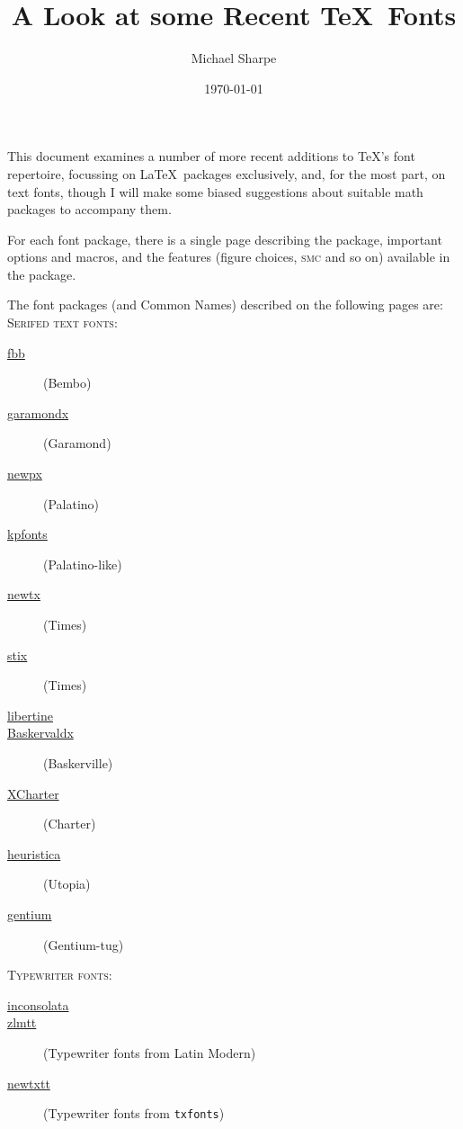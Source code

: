 \documentclass{article}
\title{A Look at some Recent \TeX\ Fonts}
\author{Michael Sharpe}
\date{\today}  %
\begin{document}
\maketitle
This document examines a number of more recent additions to \TeX's font repertoire, focussing on \LaTeX\ packages exclusively, and, for the most part, on text fonts, though I will make some biased suggestions about suitable math packages to accompany them.

For each font package,  there is a single page describing the package, important options and macros, and the features (figure choices, \textsc{smc} and so on) available in the package.

The font packages (and Common Names) described on the following pages are:\\[6pt]
\textsc{Serifed text fonts:}
\begin{description}
\item[\hspace*{1cm}\hyperlink{lnk:fbb}{fbb}] (Bembo)
\item[\hspace*{1cm}\hyperlink{lnk:garamondx}{garamondx}] (Garamond)
\item[\hspace*{1cm}\hyperlink{lnk:newpx}{newpx}] (Palatino)
\item[\hspace*{1cm}\hyperlink{lnk:kpfonts}{kpfonts}] (Palatino-like)
\item[\hspace*{1cm}\hyperlink{lnk:newtx}{newtx}] (Times)
\item[\hspace*{1cm}\hyperlink{lnk:stix}{stix}] (Times)
\item[\hspace*{1cm}\hyperlink{lnk:libertine}{libertine}]
\item[\hspace*{1cm}\hyperlink{lnk:baskervaldx}{Baskervaldx}] (Baskerville)
\item[\hspace*{1cm}\hyperlink{lnk:xcharter}{XCharter}] (Charter)
\item[\hspace*{1cm}\hyperlink{lnk:heuristica}{heuristica}] (Utopia)
\item[\hspace*{1cm}\hyperlink{lnk:gentium}{gentium}] (Gentium-tug)
\end{description}
\textsc{Typewriter fonts:}
\begin{description}
\item[\hspace*{1cm}\hyperlink{lnk:inconsolata}{inconsolata}]
\item[\hspace*{1cm}\hyperlink{lnk:zlmtt}{zlmtt}] (Typewriter fonts from Latin Modern)
\item[\hspace*{1cm}\hyperlink{lnk:newtxtt}{newtxtt}] (Typewriter fonts from {\tt txfonts})\end{description}
\end{document}
